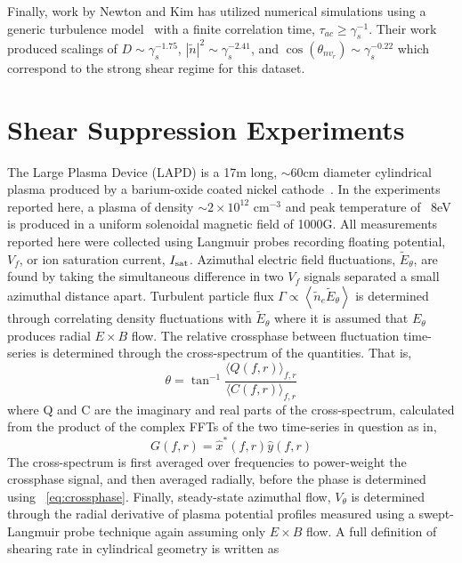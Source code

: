 \documentclass[aip,pop,amsmath,amssymb,preprint,superscriptaddress]{revtex4-1} %
\begin{document}
Finally, work by Newton and Kim has utilized numerical simulations
using a generic turbulence model~\cite{newton11} with a finite
correlation time, $\tau_{ac} \geq \gamma_{s}^{-1}$. Their work produced scalings of $D \sim \gamma_{s}^{-1.75}$, $|\tilde{n}|^{2} \sim \gamma_{s}^{-2.41}$, and $\cos(\theta_{nv_{r}}) \sim \gamma_{s}^{-0.22}$ which correspond to the strong shear regime for this dataset.

\section{Shear Suppression Experiments}

The Large Plasma Device (LAPD) is a 17m long, $\sim$60cm diameter cylindrical plasma produced by a barium-oxide coated nickel cathode~\cite{gek91}. In the experiments reported here, a plasma of density $\sim$$2 \times 10^{12}$ cm$^{-3}$ and peak temperature of ~8eV is produced in a uniform solenoidal magnetic field of 1000G. All measurements reported here were collected using Langmuir probes recording floating potential, $V_{f}$, or ion saturation current, $I_{\rm sat}$. Azimuthal electric field fluctuations, $\tilde{E}_{\theta}$, are found by taking the simultaneous difference in two $V_{f}$ signals separated a small azimuthal distance apart. Turbulent particle flux $\Gamma \propto \left<\tilde{n}_e \tilde{E}_\theta\right>$ is determined through correlating density fluctuations with $\tilde{E}_{\theta}$ where it is assumed that $E_{\theta}$ produces radial $E \times B$ flow. The relative crossphase between fluctuation time-series is determined through the cross-spectrum of the quantities. That is,
%
\begin{equation}
\theta = \tan^{-1}\frac{\langle Q(f,r)\rangle_{f,r}}{\langle C(f,r)\rangle_{f,r}}
\label{eq:crossphase}
\end{equation}
%
where Q and C are the imaginary and real parts of the cross-spectrum, calculated from the product of the complex FFTs of the two time-series in question as in,
\begin{equation}
G(f,r) = \hat{x}^{\ast}(f,r)\hat{y}(f,r)
\label{eq:crossspectrum}
\end{equation}
%
The cross-spectrum is first averaged over frequencies to power-weight the crossphase signal, and then averaged radially, before the phase is determined using ~\ref{eq:crossphase}. Finally, steady-state azimuthal flow, $V_{\theta}$ is determined through the radial derivative of plasma potential profiles measured using a swept-Langmuir probe technique again assuming only $E \times B$ flow. A full definition of shearing rate in cylindrical geometry is written as~\cite{hahm94}
$$
\end{document}
